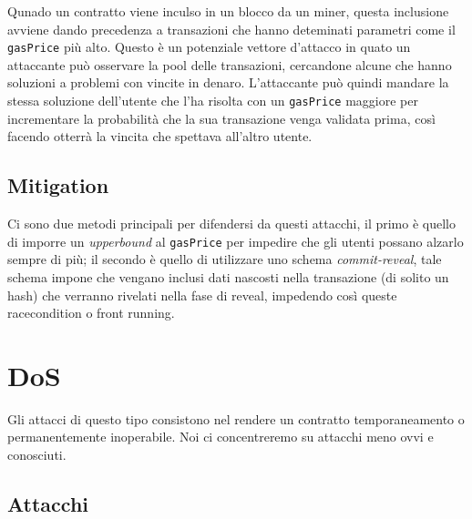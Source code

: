 Qunado un contratto viene inculso in un blocco da un miner,
questa inclusione avviene dando precedenza a transazioni che hanno deteminati
parametri come il \verb|gasPrice| più alto.
Questo è un potenziale vettore d'attacco in quato un attaccante può osservare
la pool delle transazioni, cercandone alcune che hanno soluzioni a problemi con
vincite in denaro. L'attaccante può quindi mandare la stessa soluzione dell'utente
che l'ha risolta con un \verb|gasPrice| maggiore per incrementare la probabilità
che la sua transazione venga validata prima, così facendo otterrà la vincita
che spettava all'altro utente.

\subsection{Mitigation}

Ci sono due metodi principali per difendersi da questi attacchi,
il primo è quello di imporre un \textit{upperbound} al \verb|gasPrice|
per impedire che gli utenti possano alzarlo sempre di più;
il secondo è quello di utilizzare uno schema \textit{commit-reveal},
tale schema impone che vengano inclusi dati nascosti nella transazione
(di solito un hash) che verranno rivelati nella fase di reveal,
impedendo così queste racecondition o front running.

\section{DoS}

Gli attacci di questo tipo consistono nel rendere un contratto temporaneamento
o permanentemente inoperabile.
Noi ci concentreremo su attacchi meno ovvi e conosciuti.

\subsection{Attacchi}

